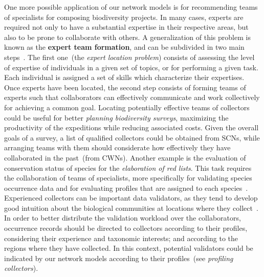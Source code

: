 One more possible application of our network models is for recommending teams of specialists for composing biodiversity projects.
In many cases, experts are required not only to have a substantial expertise in their respective areas, but also to be prone to collaborate with others.
%
A generalization of this problem is known as the \textbf{expert team formation}, and can be subdivided in two main steps~\cite{Lappas2011}. 
The first one~(the \textit{expert location problem}) consists of assessing the level of expertise of individuals in a given set of topics, or for performing a given task.
Each individual is assigned a set of skills which characterize their expertises.
Once experts have been located, the second step consists of forming teams of experts such that collaborators can effectively communicate and work collectively for achieving a common goal.
%
Locating potentially effective teams of collectors could be useful for better \textit{planning biodiversity surveys}, maximizing the productivity of the expeditions while reducing associated costs.
Given the overall goals of a survey, a list of qualified collectors could be obtained from SCNs, while arranging teams with them should considerate how effectively they have collaborated in the past~(from CWNs).  
%
Another example is the evaluation of conservation status of species for the \textit{elaboration of red lists}.
This task requires the collaboration of teams of specialists, more specifically for validating species occurrence data and for evaluating profiles that are assigned to each species~\cite{Martinelli2013}.
Experienced collectors can be important data validators, as they tend to develop good intuition about the biological communities at locations where they collect~\cite{Noss1996}.
In order to better distribute the validation workload over the collaborators, occurrence records should be directed to collectors according to their profiles, considering their experience and taxonomic interests; and according to the regions where they have collected.
In this context, potential validators could be indicated by our network models according to their profiles~(see \textit{profiling collectors}).

